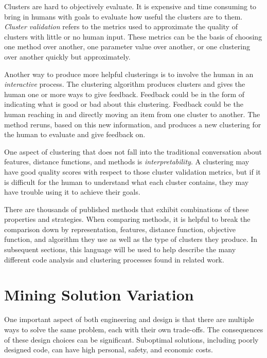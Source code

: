 Clusters are hard to objectively evaluate. It is expensive and time consuming to bring in humans with goals to evaluate how useful the clusters are to them. {\it Cluster validation} refers to the metrics used to approximate the quality of clusters with little or no human input. These metrics can be the basis of choosing one method over another, one parameter value over another, or one clustering over another quickly but approximately.

Another way to produce more helpful clusterings is to involve the human in an {\it interactive} process. The clustering algorithm produces clusters and gives the human one or more ways to give feedback. Feedback could be in the form of indicating what is good or bad about this clustering. Feedback could be the human reaching in and directly moving an item from one cluster to another. The method reruns, based on this new information, and produces a new clustering for the human to evaluate and give feedback on.

One aspect of clustering that does not fall into the traditional conversation about features, distance functions, and methods is {\it interpretability}. A clustering may have good quality scores with respect to those cluster validation metrics, but if it is difficult for the human to understand what each cluster contains, they may have trouble using it to achieve their goals.

There are thousands of published methods that exhibit combinations of these properties and strategies. When comparing methods, it is helpful to break the comparison down by representation, features, distance function, objective function, and algorithm they use as well as the type of clusters they produce. In subsequent sections, this language will be used to help describe the many different code analysis and clustering processes found in related work.


\section{Mining Solution Variation}

One important aspect of both engineering and design is that there are multiple ways to solve the same problem, each with their own trade-offs. The consequences of these design choices can be significant. Suboptimal solutions, including poorly designed code, can have high personal, safety, and economic costs. 

